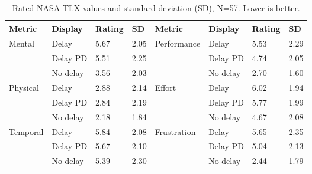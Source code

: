 \begin{table}[]
\small
\centering
\caption{Rated NASA TLX values and standard deviation (SD), N=57. Lower is better.}
\label{tlx_values}
\begin{tabularx}{\textwidth}{@{}llXXllXX@{}}
\toprule
Metric      & Display  & Rating      & SD         &        Metric      & Display  & Rating      & SD                 \\ \midrule
Mental      & Delay    & 5.67        & 2.05       &        Performance & Delay    & 5.53        & 2.29               \\
            & Delay PD & 5.51        & 2.25       &                    & Delay PD & 4.74        & 2.05               \\
            & No delay & 3.56        & 2.03       &                    & No delay & 2.70        & 1.60               \\\addlinespace
Physical    & Delay    & 2.88        & 2.14       &        Effort      & Delay    & 6.02        & 1.94               \\
            & Delay PD & 2.84        & 2.19       &                    & Delay PD & 5.77        & 1.99               \\
            & No delay & 2.18        & 1.84       &                    & No delay & 4.67        & 2.08               \\\addlinespace
Temporal    & Delay    & 5.84        & 2.08       &        Frustration & Delay    & 5.65        & 2.35               \\
            & Delay PD & 5.67        & 2.10       &                    & Delay PD & 5.04        & 2.13               \\
            & No delay & 5.39        & 2.30       &                    & No delay & 2.44        & 1.79               \\ \bottomrule

\end{tabularx}
\end{table}